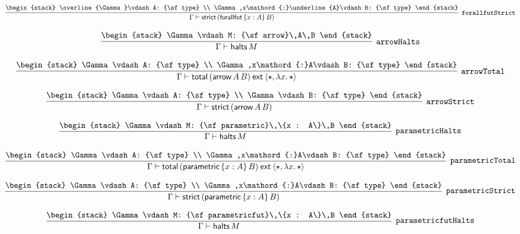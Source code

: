 \[
\infer[{\tt forallfutStrict}]{\Gamma \vdash {\sf strict}\,({\sf forallfut}\,\{x : A\}\,B)}{
\begin{stack}
\overline{\Gamma}\vdash A: {\sf type}
\\
\Gamma ,x\mathord{:}\underline{A}\vdash B: {\sf type}
\end{stack}}
\]

\[
\infer[{\tt arrowHalts}]{\Gamma \vdash {\sf halts}\,M}{
\begin{stack}
\Gamma \vdash M: {\sf arrow}\,A\,B
\end{stack}}
\]

\[
\infer[{\tt arrowTotal}]{\Gamma \vdash {\sf total}\,({\sf arrow}\,A\,B)\:{\sf ext}\:\langle \star ,\lambda x.\,\star \rangle }{
\begin{stack}
\Gamma \vdash A: {\sf type}
\\
\Gamma ,x\mathord{:}A\vdash B: {\sf type}
\end{stack}}
\]

\[
\infer[{\tt arrowStrict}]{\Gamma \vdash {\sf strict}\,({\sf arrow}\,A\,B)}{
\begin{stack}
\Gamma \vdash A: {\sf type}
\\
\Gamma \vdash B: {\sf type}
\end{stack}}
\]

\[
\infer[{\tt parametricHalts}]{\Gamma \vdash {\sf halts}\,M}{
\begin{stack}
\Gamma \vdash M: {\sf parametric}\,\{x : A\}\,B
\end{stack}}
\]

\[
\infer[{\tt parametricTotal}]{\Gamma \vdash {\sf total}\,({\sf parametric}\,\{x : A\}\,B)\:{\sf ext}\:\langle \star ,\lambda x.\,\star \rangle }{
\begin{stack}
\Gamma \vdash A: {\sf type}
\\
\Gamma ,x\mathord{:}A\vdash B: {\sf type}
\end{stack}}
\]

\[
\infer[{\tt parametricStrict}]{\Gamma \vdash {\sf strict}\,({\sf parametric}\,\{x : A\}\,B)}{
\begin{stack}
\Gamma \vdash A: {\sf type}
\\
\Gamma ,x\mathord{:}A\vdash B: {\sf type}
\end{stack}}
\]

\[
\infer[{\tt parametricfutHalts}]{\Gamma \vdash {\sf halts}\,M}{
\begin{stack}
\Gamma \vdash M: {\sf parametricfut}\,\{x : A\}\,B
\end{stack}}
\]

